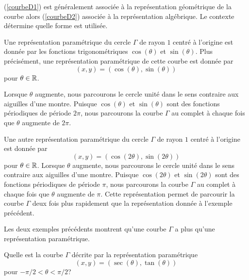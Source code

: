 {\begin{defn}
(\ref{courbeD1}) est généralement associée à la représentation
géométrique de la courbe alors (\ref{courbeD2}) associée à la
représentation algébrique.  Le contexte détermine quelle forme est
utilisée.
\end{defn}


\begin{egg}
Une représentation paramétrique du cercle $\Gamma$ de rayon $1$ centré
à l'origine est donnée par les fonctions trigonométriques
$\cos(\theta)$ et $\sin(\theta)$.  Plus précisément, une
représentation paramétrique de cette courbe est donnée par
\[
(x,y) = (\cos(\theta), \sin(\theta))
\]
pour $\theta \in \mathbb{R}$.


Lorsque $\theta$ augmente, nous parcourons le cercle unité dans le sens
contraire aux aiguilles d'une montre.  Puisque $\cos(\theta)$ et
$\sin(\theta)$ sont des fonctions périodiques de période $2\pi$, nous
parcourons la courbe $\Gamma$ au complet à chaque fois que $\theta$
augmente de $2\pi$.
\end{egg}

\begin{egg}
Une autre représentation paramétrique du cercle $\Gamma$ de rayon
$1$ centré à l'origine est donnée par
\[
(x,y) = (\cos(2\theta), \sin(2\theta))
\]
pour $\theta \in \mathbb{R}$.  Lorsque $\theta$ augmente, nous parcourons le
cercle unité dans le sens contraire aux aiguilles d'une
montre. Puisque $\cos(2\theta)$ et $\sin(2\theta)$ sont des fonctions
périodiques de période $\pi$, nous parcourons la courbe $\Gamma$ au
complet à chaque fois que $\theta$ augmente de $\pi$.  Cette
représentation permet de parcourir la courbe $\Gamma$ deux fois plus
rapidement que la représentation donnée à l'exemple précédent.
\end{egg}

Les deux exemples précédents montrent qu'une courbe $\Gamma$ a plus
qu'une représentation paramétrique.

\begin{egg}
Quelle est la courbe $\Gamma$ décrite par la représentation
paramétrique
\[
(x,y) = (\sec(\theta) , \tan(\theta))
\]
pour $-\pi/2 < \theta < \pi/2$?


\end{egg}}
